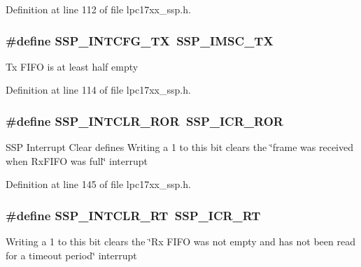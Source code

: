 \-Definition at line 112 of file lpc17xx\-\_\-ssp.\-h.

\hypertarget{group___s_s_p___public___macros_ga12314c10c13b5663431e2f3d794d8e6d}{
\subsubsection[{\-S\-S\-P\-\_\-\-I\-N\-T\-C\-F\-G\-\_\-\-T\-X}]{\setlength{\rightskip}{0pt plus 5cm}\#define {\bf \-S\-S\-P\-\_\-\-I\-N\-T\-C\-F\-G\-\_\-\-T\-X}~{\bf \-S\-S\-P\-\_\-\-I\-M\-S\-C\-\_\-\-T\-X}}}\label{group___s_s_p___public___macros_ga12314c10c13b5663431e2f3d794d8e6d}
\-Tx \-F\-I\-F\-O is at least half empty 

\-Definition at line 114 of file lpc17xx\-\_\-ssp.\-h.

\hypertarget{group___s_s_p___public___macros_gab79665cc09989a9730abb6b5452df1d7}{
\subsubsection[{\-S\-S\-P\-\_\-\-I\-N\-T\-C\-L\-R\-\_\-\-R\-O\-R}]{\setlength{\rightskip}{0pt plus 5cm}\#define {\bf \-S\-S\-P\-\_\-\-I\-N\-T\-C\-L\-R\-\_\-\-R\-O\-R}~{\bf \-S\-S\-P\-\_\-\-I\-C\-R\-\_\-\-R\-O\-R}}}\label{group___s_s_p___public___macros_gab79665cc09989a9730abb6b5452df1d7}
\-S\-S\-P \-Interrupt \-Clear defines \-Writing a 1 to this bit clears the \char`\"{}frame was received when
 Rx\-F\-I\-F\-O was full\char`\"{} interrupt 

\-Definition at line 145 of file lpc17xx\-\_\-ssp.\-h.

\hypertarget{group___s_s_p___public___macros_ga36b024118d27e68540e8e403b897ed75}{
\subsubsection[{\-S\-S\-P\-\_\-\-I\-N\-T\-C\-L\-R\-\_\-\-R\-T}]{\setlength{\rightskip}{0pt plus 5cm}\#define {\bf \-S\-S\-P\-\_\-\-I\-N\-T\-C\-L\-R\-\_\-\-R\-T}~{\bf \-S\-S\-P\-\_\-\-I\-C\-R\-\_\-\-R\-T}}}\label{group___s_s_p___public___macros_ga36b024118d27e68540e8e403b897ed75}
\-Writing a 1 to this bit clears the \char`\"{}\-Rx F\-I\-F\-O was not empty and
 has not been read for a timeout period\char`\"{} interrupt 

